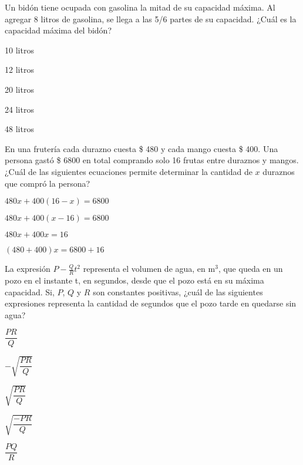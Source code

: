 \documentclass{sn-guia}
\begin{document}
\begin{problemas}
    \problema Un bidón tiene ocupada con gasolina la mitad de su capacidad máxima. Al 
    agregar 8 litros de gasolina, se llega a las 5/6 partes de su capacidad. ¿Cuál 
    es la capacidad máxima del bidón?
    \begin{alternativas}[]
        \item 10 litros
        \item 12 litros
        \item 20 litros
        \item 24 litros
        \item 48 litros
    \end{alternativas}
    \problema En una frutería cada durazno cuesta \$ 480 y cada mango cuesta \$ 400.
    Una persona gastó \$ 6800 en total comprando solo 16 frutas entre duraznos y mangos.
    ¿Cuál de las siguientes ecuaciones permite determinar la cantidad de $x$ duraznos 
    que compró la persona?
    \begin{alternativas}[]
        \item $480x + 400(16-x) = 6800$
        \item $480x + 400(x-16) = 6800$
        \item $480x + 400x = 16$
        \item $(480 + 400)x = 6800 + 16$
    \end{alternativas}
    \problema La expresión $P-\frac{Q}{R}t^2$ representa el volumen de agua, en 
    $\textrm{m}^3$, que queda en un pozo en el instante t, en segundos, desde que el pozo
    está en su máxima capacidad. Si, $P$, $Q$ y $R$ son constantes positivas, ¿cuál de 
    las siguientes expresiones representa la cantidad de segundos que el pozo tarde 
    en quedarse sin agua?
    \begin{alternativas}[]
        \item $\dfrac{PR}{Q}$
        \item $-\sqrt{\dfrac{PR}{Q}}$
        \item $\sqrt{\dfrac{PR}{Q}}$
        \item $\sqrt{\dfrac{-PR}{Q}}$
        \item $\dfrac{PQ}{R}$
    \end{alternativas}
\end{problemas}

\vspace*{\fill}
\begin{center}
\end{center}
\vspace*{\fill}
\end{document}

